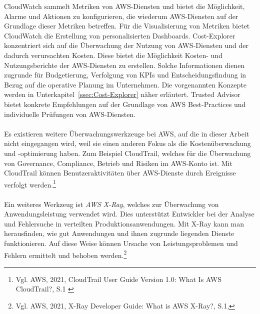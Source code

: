 CloudWatch sammelt Metriken von AWS-Diensten und bietet die Möglichkeit, Alarme und Aktionen zu konfigurieren, die wiederum AWS-Diensten auf der Grundlage dieser Metriken betreffen. Für die Visualisierung von Metriken bietet CloudWatch die Erstellung von personalisierten Dashboards.
Cost-Explorer konzentriert sich auf die Überwachung der Nutzung von AWS-Diensten und der dadurch verursachten Kosten. Diese bietet die Möglichkeit Kosten- und Nutzungsberichte der AWS-Diensten zu erstellen. Solche Informationen dienen zugrunde für Budgetierung, %
Verfolgung von KPIs und Entscheidungsfindung in Bezug auf die operative Planung im Unternehmen. Die vorgenannten Konzepte werden in Unterkapitel~\ref{ssec:Cost-Explorer} näher erläutert. %
Trusted Advisor bietet konkrete Empfehlungen auf der Grundlage von AWS Best-Practices und individuelle Prüfungen von AWS-Diensten.
\\\\
Es existieren weitere Überwachungswerkzeuge bei AWS, auf die in dieser Arbeit nicht eingegangen wird, weil sie einen anderen Fokus als die Kostenüberwachung und -optimierung haben. Zum Beispiel CloudTrail, welches für die Überwachung von Governance, Compliance, Betrieb und Risiken im AWS-Konto ist. Mit CloudTrail können Benutzeraktivitäten über AWS-Dienste durch Ereignisse verfolgt werden.\footnote{Vgl. AWS, 2021, CloudTrail User Guide Version 1.0: What Is AWS CloudTrail?, S.1 \cite{AMZ27}}
\\\\
Ein weiteres Werkzeug ist \textit{AWS X-Ray}, welches zur Überwachung von Anwendungsleistung verwendet wird. Dies unterstützt Entwickler bei der Analyse und Fehlersuche in verteilten Produktionsanwendungen. Mit X-Ray kann man herausfinden, wie gut Anwendungen und ihnen zugrunde liegenden Dienste funktionieren. Auf diese Weise können Ursache von Leistungsproblemen und Fehlern ermittelt und behoben werden.\footnote{Vgl. AWS, 2021, X-Ray Developer Guide: What is AWS X-Ray?, S.1\cite{AMZ27},}
\newpage

